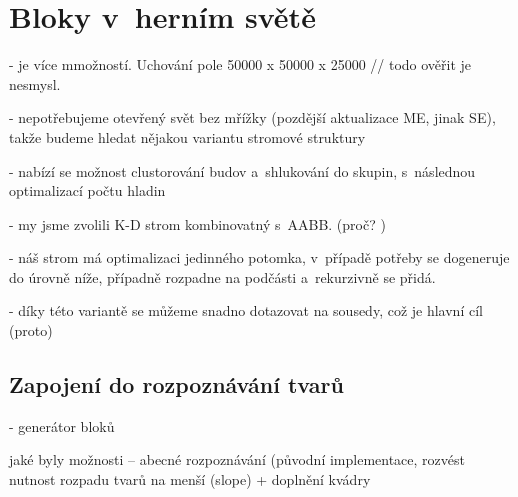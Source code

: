 
\section{Bloky v~herním světě}
\label{sec:blocksWorld}


- je více mmožností. Uchování pole 50000 x 50000 x 25000 // todo ověřit
je nesmysl. 

- nepotřebujeme otevřený svět bez mřížky (pozdější aktualizace ME, jinak SE), takže budeme hledat nějakou variantu stromové struktury

- nabízí se možnost clustorování budov a~shlukování do skupin, s~následnou optimalizací počtu hladin

- my jsme zvolili K-D strom kombinovatný s~AABB. (proč? )

- náš strom má optimalizaci jedinného potomka, v~případě potřeby se dogeneruje do úrovně níže, případně rozpadne na podčásti a~rekurzivně se přidá.

- díky této variantě se můžeme snadno dotazovat na sousedy, což je hlavní cíl (proto)



\subsection{Zapojení do rozpoznávání tvarů}

- generátor bloků

jaké byly možnosti -- abecné rozpoznávání (původní implementace, rozvést nutnost rozpadu tvarů na menší (slope) + doplnění kvádry

